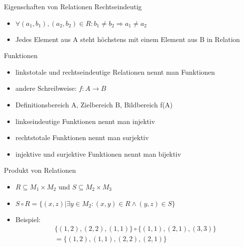 \begin{frame}{Eigenschaften von Relationen}
  Rechtseindeutig
  \begin{itemize}
    \item $\forall (a_1,b_1),(a_2,b_2) \in R: b_1\neq b_2 \Rightarrow a_1 \neq a_2$
    \item Jedes Element aus A steht höchstens mit einem Element aus B in Relation
  \end{itemize}
  \begin{center}
  \end{center}
\end{frame}

\begin{frame}{Funktionen}
  \begin{itemize}
    \item linkstotale und rechtseindeutige Relationen nennt man Funktionen
    \item andere Schreibweise: $f: A \rightarrow B$
    \item Definitionsbereich A, Zielbereich B, Bildbereich f(A)
    \item linkseindeutige Funktionen nennt man injektiv
    \item rechtstotale Funktionen nennt man surjektiv
    \item injektive und surjektive Funktionen nennt man bijektiv
  \end{itemize}
\end{frame}

\begin{frame}{Produkt von Relationen}
  \begin{itemize}
    \item $R\subseteq M_1 \times M_2$ und $S\subseteq M_2 \times M_3$
    \item $S\circ R=\{(x,z)|\exists y \in M_2: (x,y) \in R \land (y,z) \in S\}$
    \item Beispiel:\begin{align*}&\{(1,2),(2,2),(1,1)\}\circ \{(1,1),(2,1),(3,3)\}\\ &=\{(1,2),(1,1),(2,2),(2,1)\}\end{align*}
  \end{itemize}
\end{frame}

